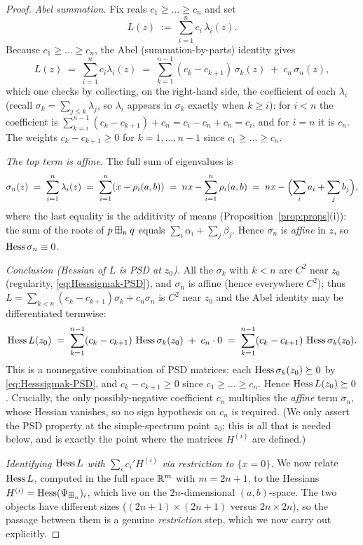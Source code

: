 \begin{proof}
\smallskip\noindent\textit{Abel summation.} Fix reals $c_1\ge\dots\ge c_n$ and
set
\[
L(z)\;:=\;\sum_{i=1}^n c_i\,\lambda_i(z).
\]
Because $c_1\ge\dots\ge c_n$, the Abel (summation-by-parts) identity gives
\[
L(z)\;=\;\sum_{i=1}^n c_i\lambda_i(z)
\;=\;\sum_{k=1}^{n-1}(c_k-c_{k+1})\,\sigma_k(z)\;+\;c_n\,\sigma_n(z),
\]
which one checks by collecting, on the right-hand side, the coefficient of each
$\lambda_i$ (recall $\sigma_k=\sum_{j\le k}\lambda_j$, so $\lambda_i$ appears in
$\sigma_k$ exactly when $k\ge i$): for $i<n$ the coefficient is
$\sum_{k=i}^{n-1}(c_k-c_{k+1})+c_n=c_i-c_n+c_n=c_i$, and for $i=n$ it is $c_n$.
The weights $c_k-c_{k+1}\ge0$ for $k=1,\dots,n-1$ since $c_1\ge\dots\ge c_n$.

\smallskip\noindent\textit{The top term is affine.} The full sum of eigenvalues
is
\[
\sigma_n(z)\;=\;\sum_{i=1}^n\lambda_i(z)\;=\;\sum_{i=1}^n(x-\rho_i(a,b))
\;=\;nx-\sum_{i=1}^n\rho_i(a,b)
\;=\;nx-\Bigl(\sum_i a_i+\sum_j b_j\Bigr),
\]
where the last equality is the additivity of means
(Proposition~\ref{prop:props}(i)): the sum of the roots of $p\boxplus_n q$ equals
$\sum_i\alpha_i+\sum_j\beta_j$. Hence $\sigma_n$ is \emph{affine} in $z$, so
$\operatorname{Hess}\sigma_n\equiv0$.

\smallskip\noindent\textit{Conclusion (Hessian of $L$ is PSD at $z_0$).} All the $\sigma_k$ with
$k<n$ are $C^2$ near $z_0$ (regularity, \eqref{eq:Hesssigmak-PSD}), and $\sigma_n$
is affine (hence everywhere $C^2$); thus $L=\sum_{k<n}(c_k-c_{k+1})\sigma_k+c_n\sigma_n$
is $C^2$ near $z_0$ and the Abel identity may be differentiated termwise:
\[
\operatorname{Hess} L(z_0)
\;=\;\sum_{k=1}^{n-1}(c_k-c_{k+1})\,\operatorname{Hess}\sigma_k(z_0)\;+\;c_n\cdot0
\;=\;\sum_{k=1}^{n-1}(c_k-c_{k+1})\,\operatorname{Hess}\sigma_k(z_0).
\]
This is a nonnegative combination of PSD matrices: each $\operatorname{Hess}\sigma_k(z_0)\succeq 0$
by \eqref{eq:Hesssigmak-PSD}, and $c_k-c_{k+1}\ge0$ since $c_1\ge\dots\ge c_n$. Hence
$\operatorname{Hess} L(z_0)\succeq 0$. Crucially, the only possibly-negative coefficient $c_n$
multiplies the \emph{affine} term $\sigma_n$, whose Hessian vanishes, so no sign
hypothesis on $c_n$ is required. (We only assert the PSD property at the
simple-spectrum point $z_0$; this is all that is needed below, and is exactly the
point where the matrices $H^{(i)}$ are defined.)

\smallskip\noindent\textit{Identifying $\operatorname{Hess} L$ with $\sum_i c_i' H^{(i)}$ via restriction to $\{x=0\}$.}
We now relate $\operatorname{Hess} L$, computed in the full space $\mathbb{R}^m$ with
$m=2n+1$, to the Hessians $H^{(i)}=\operatorname{Hess}(\Psi_{\boxplus_n})_i$, which live on the
$2n$-dimensional $(a,b)$-space. The two objects have different sizes
($(2n{+}1)\times(2n{+}1)$ versus $2n\times2n$), so the passage between them is a
genuine \emph{restriction} step, which we now carry out explicitly.


\end{proof}

